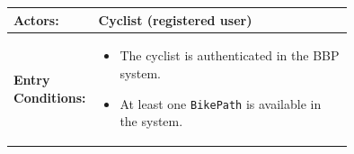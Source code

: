 \begin{center}
\begin{longtable}{|l|p{0.75\linewidth}|}
    \hline
    \textbf{Actors:}           
    & Cyclist (registered user)                                                                 \\
    \hline

    \textbf{Entry Conditions:} 
    & \begin{itemize}
          \item The cyclist is authenticated in the BBP system.
          \item At least one \texttt{BikePath} is available in the system.
       \end{itemize}                                                                            \\
    \hline


\end{longtable}
\end{center}
